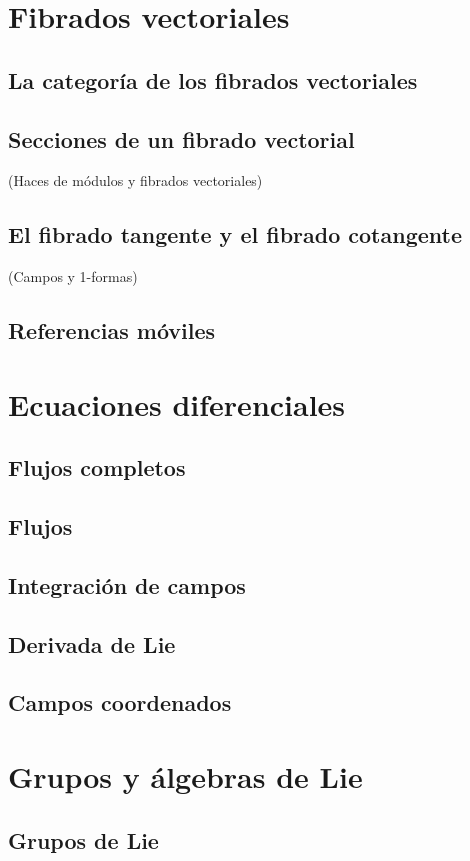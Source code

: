 \documentclass[12pt,a4paper]{book}
\theoremstyle{definition} \newtheorem{defn}[thm]{Definición}
\theoremstyle{definition} \newtheorem{ejemplo}[thm]{Ejemplo}
\theoremstyle{definition} \newtheorem{ejercicio}[thm]{Ejercicio}
\theoremstyle{remark} \newtheorem*{obs}{Observación}
\begin{document}
	  \chapter{Fibrados vectoriales}
	  \section{La categoría de los fibrados vectoriales}
	  \section{Secciones de un fibrado vectorial}
	  (Haces de módulos y fibrados vectoriales)
	  \section{El fibrado tangente y el fibrado cotangente}
	  (Campos y 1-formas)
	  \section{Referencias móviles}

	  \chapter{Ecuaciones diferenciales}
	  \section{Flujos completos}
	  \section{Flujos}
	  \section{Integración de campos}
	  \section{Derivada de Lie}
	  \section{Campos coordenados}
	  \chapter{Grupos y álgebras de Lie}
	  \section{Grupos de Lie}
\end{document}
